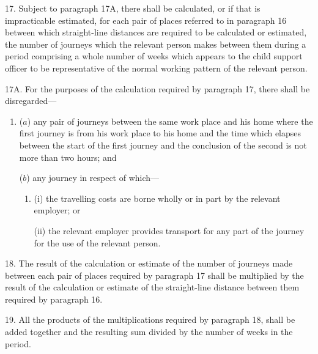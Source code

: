 \documentclass[12pt,a4paper]{article}
\begin{document}

17.  Subject to paragraph 17A, there shall be calculated, or if that is impracticable estimated, for each pair of places referred to in paragraph 16 between which straight-line distances are required to be calculated or estimated, the number of journeys which the relevant person makes between them during a period comprising a whole number of weeks which appears to the child support officer to be representative of the normal working pattern of the relevant person.


\medskip

17A.  For the purposes of the calculation required by paragraph 17, there shall be disregarded—
\begin{enumerate}\item[]
($a$) any pair of journeys between the same work place and his home where the first journey is from his work place to his home and the time which elapses between the start of the first journey and the conclusion of the second is not more than two hours; and

($b$) any journey in respect of which—
\begin{enumerate}\item[]
(i) the travelling costs are borne wholly or in part by the relevant employer; or

(ii) the relevant employer provides transport for any part of the journey for the use of the relevant person.
\end{enumerate}
\end{enumerate}


\medskip

18.  The result of the calculation or estimate of the number of journeys made between each pair of places required by paragraph 17 shall be multiplied by the result of the calculation or estimate of the straight-line distance between them required by paragraph 16.

\medskip

19.  All the products of the multiplications required by paragraph 18, shall be added together and the resulting sum divided by the number of weeks in the period.
\end{document}
